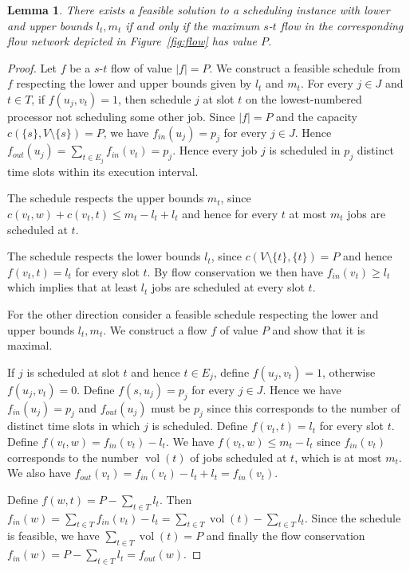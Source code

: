 \documentclass[a4paper]{article}
\DeclareMathOperator{\vol}{vol}
\newtheorem{lemma}[theorem]{Lemma}
\begin{document}
\begin{lemma}\label{lemma:flow_feasibility}
  There exists a feasible solution to a scheduling instance with lower and upper bounds $l_t, m_t$ if and only if the maximum $s$-$t$ flow in the corresponding flow network depicted in Figure~\ref{fig:flow} has value $P$.
\end{lemma}
\begin{proof}
  Let $f$ be a $s$-$t$ flow of value $|f| = P$.
  We construct a feasible schedule from $f$ respecting the lower and upper bounds given by $l_t$ and $m_t$.
  For every $j \in J$ and  $t \in T$, if $f(u_j, v_t) = 1$, then schedule $j$ at slot $t$ on the lowest-numbered processor not scheduling some other job.
  Since $|f| = P$ and the capacity $c(\{s\}, V \setminus \{s\}) = P$, we have $f_{in}(u_j) = p_j$ for every $j \in J$.
  Hence $f_{out}(u_j) = \sum_{t \in E_j} f_{in}(v_t) = p_j$.
  Hence every job $j$ is scheduled in $p_j$ distinct time slots within its execution interval.

  The schedule respects the upper bounds $m_t$, since $c(v_t, w) + c(v_t, t) \leq m_t - l_t + l_t$ and hence for every $t$ at most $m_t$ jobs are scheduled at $t$.

  The schedule respects the lower bounds $l_t$, since
  $c(V \setminus \{t\}, \{t\}) = P$ and hence
  $f(v_t, t) = l_t$ for every slot $t$.
  By flow conservation we then have $f_{in}(v_t) \geq l_t$ which implies that at least $l_t$ jobs are scheduled at every slot $t$.

  For the other direction consider a feasible schedule respecting the lower and upper bounds $l_t, m_t$.
  We construct a flow $f$ of value $P$ and show that it is maximal.

  If $j$ is scheduled at slot $t$ and hence $t \in E_j$,
  define $f(u_j, v_t) = 1$, otherwise $f(u_j, v_t) = 0$.
  Define $f(s, u_j) = p_j$ for every $j \in J$.
  Hence we have $f_{in}(u_j) = p_j$
  and $f_{out}(u_j)$ must be  $p_j$ since this corresponds to the number of distinct time slots in which $j$ is scheduled.
  Define $f(v_t, t) = l_t$ for every slot $t$.
  Define $f(v_t, w) = f_{in}(v_t) - l_t$.
  We have $f(v_t, w) \leq m_t - l_t$ since $f_{in}(v_t)$ corresponds to the number $\vol(t)$ of jobs scheduled at $t$, which is at most $m_t$.
  We also have $f_{out}(v_t) = f_{in}(v_t) - l_t + l_t = f_{in}(v_t)$.

  Define $f(w, t) = P - \sum_{t \in T} l_t$.
  Then $f_{in}(w) = \sum_{t \in T} f_{in}(v_t) - l_t
  = \sum_{t \in T} \vol(t) - \sum_{t \in T} l_t$.
  Since the schedule is feasible, we have $\sum_{t \in T} \vol(t) = P$ and finally the flow conservation $f_{in}(w) = P - \sum_{t \in T} l_t = f_{out}(w)$.

\end{proof}
\end{document}
